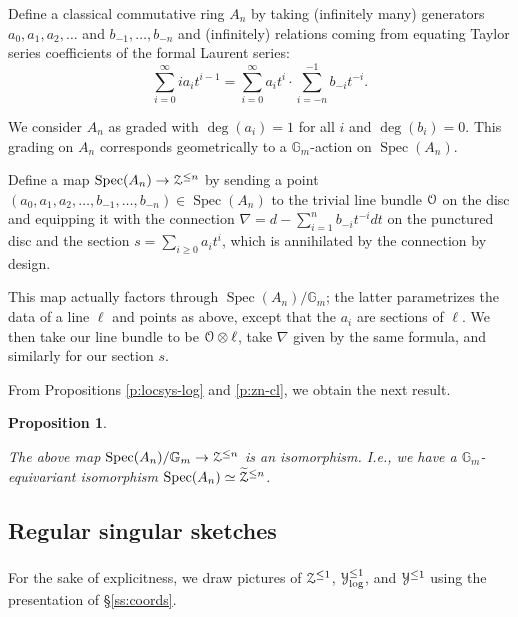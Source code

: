 \documentclass[reqno,11pt]{amsart}
\numberwithin{equation}{subsection}
\newtheorem{prop}[thm]{Proposition}
\theoremstyle{remark}
\newcommand{\bG}{{\mathbb G}}
\newcommand{\sO}{{\EuScript O}}
\newcommand{\sY}{{\EuScript Y}}
\newcommand{\sZ}{{\EuScript Z}}
\newcommand{\on}{\operatorname}
\newcommand{\Spec}{\on{Spec}}
\begin{document}
Define a classical commutative ring $A_n$ by taking
(infinitely many) generators 
$a_0,a_1,a_2,\ldots$ and $b_{-1},\ldots,b_{-n}$
and (infinitely) relations coming from equating Taylor series coefficients
of the formal Laurent series:
%
\[
\sum_{i=0}^{\infty} ia_it^{i-1} =
\sum_{i=0}^{\infty} a_it^i \cdot 
\sum_{i=-n}^{-1} b_{-i}t^{-i}.
\]

We consider $A_n$ as graded with $\deg(a_i) = 1$ 
for all $i$ and $\deg(b_i) = 0$.
This grading on $A_n$ corresponds geometrically 
to a $\bG_m$-action on $\Spec(A_n)$.

Define a map $\Spec(A_n) \to \sZ^{\leq n}$ 
by sending a point $(a_0,a_1,a_2,\ldots,b_{-1},\ldots,b_{-n}) 
\in \Spec(A_n)$ to the trivial line bundle
$\sO$ on the disc and equipping it with the connection
$\nabla = d-\sum_{i = 1}^n b_{-i} t^{-i} dt$ on the punctured
disc and the section $s = \sum_{i \geq 0} a_i t^i$,
which is annihilated by the connection by design.

This map actually factors through $\Spec(A_n)/\bG_m$; the
latter parametrizes the data of a line $\ell$ and
points as above, except that the $a_i$ are sections
of $\ell$. We then take our line bundle to be
$\sO \otimes \ell$, take $\nabla$ given by the same formula,
and similarly for our section $s$.

From Propositions \ref{p:locsys-log} and \ref{p:zn-cl},
we obtain the next result.

\begin{prop}\label{p:zn-coords}

The above map
$\Spec(A_n)/\bG_m \to \sZ^{\leq n}$ is an isomorphism.
I.e., we have a $\bG_m$-equivariant isomorphism
$\Spec(A_n) \simeq \widetilde{\sZ}^{\leq n}$.

\end{prop}




\subsection{Regular singular sketches}\label{ss:rs-sketch}

\subsubsection{}

For the sake of explicitness, we draw pictures of $\sZ^{\leq 1}$,
$\sY_{\log}^{\leq 1}$, and $\sY^{\leq 1}$ using
the presentation of \S \ref{ss:coords}. 

\subsubsection{}
\end{document}
